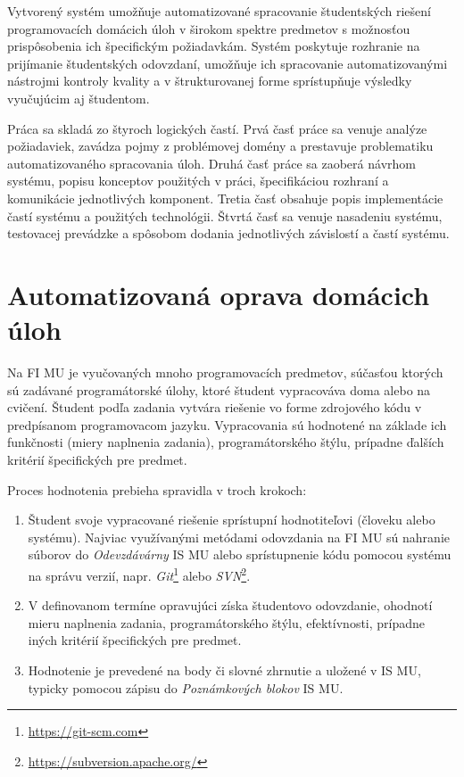 \documentclass[
  digital, %
  twoside, %
  table,   %
  lof,     %
  lot,     %
]{fithesis3}
\begin{document}
Vytvorený systém umožňuje automatizované spracovanie študentských riešení programovacích domácich úloh v širokom spektre predmetov s možnosťou prispôsobenia ich špecifickým požiadavkám. Systém poskytuje rozhranie na prijímanie študentských odovzdaní, umožňuje ich spracovanie automatizovanými nástrojmi kontroly kvality a v štrukturovanej forme sprístupňuje výsledky vyučujúcim aj študentom.

Práca sa skladá zo štyroch logických častí. Prvá časť práce sa venuje analýze požiadaviek, zavádza pojmy z problémovej domény a prestavuje problematiku automatizovaného spracovania úloh. Druhá časť práce sa zaoberá návrhom systému, popisu konceptov použitých v práci, špecifikáciou rozhraní a komunikácie jednotlivých komponent. Tretia časť obsahuje popis implementácie častí systému a použitých technológii. Štvrtá časť sa venuje nasadeniu systému, testovacej prevádzke a spôsobom dodania jednotlivých závislostí a častí systému. 


\chapter{Automatizovaná oprava domácich úloh}

Na FI MU je vyučovaných mnoho programovacích predmetov, súčasťou ktorých sú zadávané programátorské úlohy, ktoré študent vypracováva doma alebo na cvičení. Študent podľa zadania vytvára riešenie vo forme zdrojového kódu v predpísanom programovacom jazyku. Vypracovania sú hodnotené na základe ich funkčnosti (miery naplnenia zadania), programátorského štýlu, prípadne ďalších kritérií špecifických pre predmet. 

Proces hodnotenia prebieha spravidla v troch krokoch:
\begin{enumerate}
    \item Študent svoje vypracované riešenie sprístupní hodnotiteľovi (človeku alebo systému). Najviac využívanými metódami odovzdania na FI MU sú nahranie súborov do \textit{Odevzdávárny} IS MU alebo sprístupnenie kódu pomocou systému na správu verzií, napr. \textit{Git}\footnote{\url{https://git-scm.com}} alebo \textit{SVN}\footnote{\url{https://subversion.apache.org/}}. 
    \item V definovanom termíne opravujúci získa študentovo odovzdanie, ohodnotí mieru naplnenia zadania, programátorského štýlu, efektívnosti, prípadne iných kritérií špecifických pre predmet. 
    \item Hodnotenie je prevedené na body či slovné zhrnutie a uložené v IS MU, typicky pomocou zápisu do \emph{Poznámkových blokov} IS MU.
\end{enumerate}
\end{document}

